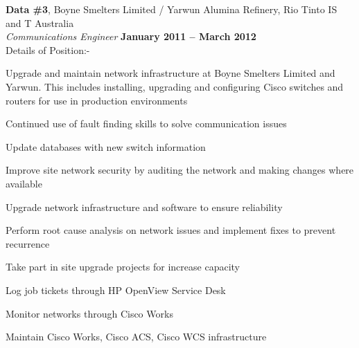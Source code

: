 \documentclass[margin,line]{resume}
\begin{document}
\begin{resume}
    {\bf Data \#3}, Boyne Smelters Limited / Yarwun Alumina Refinery, Rio Tinto IS and T Australia \vspace{2mm}\\\vspace{1mm}%
    {\sl Communications Engineer} \hfill {\bf January 2011 -- March 2012}\\
    Details of Position:-
    \begin{list2}
        \vspace*{1mm}
        \item  Upgrade and maintain network infrastructure at Boyne Smelters Limited and Yarwun. This includes installing, upgrading and configuring Cisco switches and routers for use in production environments
\item  Continued use of fault finding skills to solve communication issues
\item  Update databases with new switch information
\item  Improve site network security by auditing the network and making changes where available
\item  Upgrade network infrastructure and software to ensure reliability
\item  Perform root cause analysis on network issues and implement fixes to prevent recurrence
\item  Take part in site upgrade projects for increase capacity
\item  Log job tickets through HP OpenView Service Desk
\item  Monitor networks through Cisco Works
\item  Maintain Cisco Works, Cisco ACS, Cisco WCS infrastructure
    \end{list2}



\end{resume}
\end{document}
